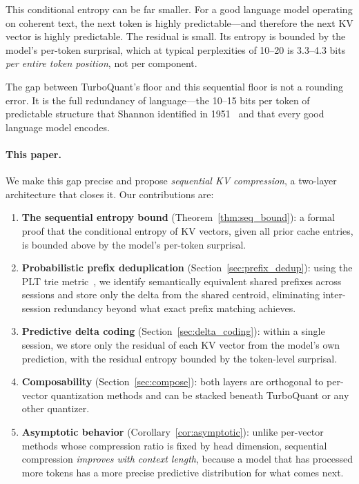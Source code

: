 \documentclass[11pt]{article}
\begin{document}
This conditional entropy can be far smaller.  For a good language model operating
on coherent text, the next token is highly predictable---and therefore the next
KV vector is highly predictable.  The residual is small.  Its entropy is bounded
by the model's per-token surprisal, which at typical perplexities of 10--20 is
3.3--4.3 bits \emph{per entire token position}, not per component.

The gap between TurboQuant's floor and this sequential floor is not a rounding
error.  It is the full redundancy of language---the 10--15 bits per token of
predictable structure that Shannon identified in 1951~\cite{shannon1951} and that
every good language model encodes.

\paragraph{This paper.}
We make this gap precise and propose \emph{sequential KV compression}, a
two-layer architecture that closes it.  Our contributions are:

\begin{enumerate}[leftmargin=2em]
  \item \textbf{The sequential entropy bound} (Theorem~\ref{thm:seq_bound}):
        a formal proof that the conditional entropy of KV vectors, given all prior
        cache entries, is bounded above by the model's per-token surprisal.

  \item \textbf{Probabilistic prefix deduplication}
        (Section~\ref{sec:prefix_dedup}):
        using the PLT trie metric~\cite{plt2026}, we identify semantically
        equivalent shared prefixes across sessions and store only the delta from
        the shared centroid, eliminating inter-session redundancy beyond what
        exact prefix matching achieves.

  \item \textbf{Predictive delta coding}
        (Section~\ref{sec:delta_coding}):
        within a single session, we store only the residual of each KV vector
        from the model's own prediction, with the residual entropy bounded by the
        token-level surprisal.

  \item \textbf{Composability} (Section~\ref{sec:compose}):
        both layers are orthogonal to per-vector quantization methods and can be
        stacked beneath TurboQuant or any other quantizer.

  \item \textbf{Asymptotic behavior} (Corollary~\ref{cor:asymptotic}):
        unlike per-vector methods whose compression ratio is fixed by head
        dimension, sequential compression \emph{improves with context length},
        because a model that has processed more tokens has a more precise
        predictive distribution for what comes next.
\end{enumerate}
\end{document}
